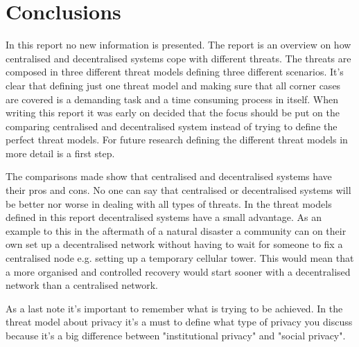 \section{Conclusions}
In this report no new information is presented.
The report is an overview on how centralised and decentralised systems cope with different threats.
The threats are composed in three different threat models defining three different scenarios.
It's clear that defining just one threat model and making sure that all corner cases are covered is a demanding task and a time consuming process in itself.
When writing this report it was early on decided that the focus should be put on the comparing centralised and decentralised system instead of trying to define the perfect threat models.
For future research defining the different threat models in more detail is a first step.

The comparisons made show that centralised and decentralised systems have their pros and cons.
No one can say that centralised or decentralised systems will be better nor worse in dealing with all types of threats.
In the threat models defined in this report decentralised systems have a small advantage.
As an example to this in the aftermath of a natural disaster a community can on their own set up a decentralised network without having to wait for someone to fix a centralised node e.g. setting up a temporary cellular tower.
This would mean that a more organised and controlled recovery would start sooner with a decentralised network than a centralised network.

As a last note it's important to remember what is trying to be achieved.
In the threat model about privacy it's a must to define what type of privacy you discuss because it's a big difference between "institutional privacy" and "social privacy".
